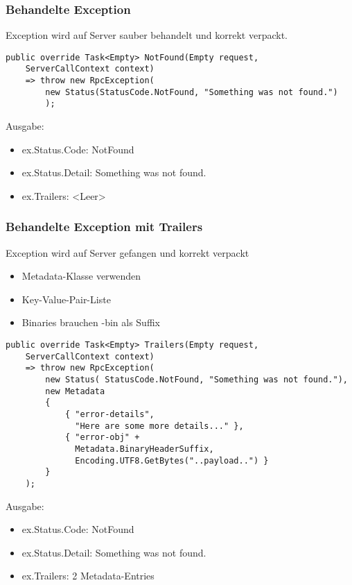 \begin{multicols*}{2}
\subsubsection{Behandelte Exception}
Exception wird auf Server sauber behandelt und korrekt verpackt.
\begin{lstlisting}
public override Task<Empty> NotFound(Empty request,
    ServerCallContext context)
    => throw new RpcException(
        new Status(StatusCode.NotFound, "Something was not found.") 
        );
\end{lstlisting}
Ausgabe:
\begin{itemize}
    \item ex.Status.Code: NotFound
    \item ex.Status.Detail: Something was not found.
    \item ex.Trailers: <Leer>
\end{itemize}
\subsubsection{Behandelte Exception mit Trailers}
Exception wird auf Server gefangen und korrekt verpackt
\begin{itemize}
    \item Metadata-Klasse verwenden
    \item Key-Value-Pair-Liste
    \item Binaries brauchen -bin als Suffix
\end{itemize}
\begin{lstlisting}
public override Task<Empty> Trailers(Empty request,
    ServerCallContext context)
    => throw new RpcException(
        new Status( StatusCode.NotFound, "Something was not found."),
        new Metadata
        {
            { "error-details",
              "Here are some more details..." },
            { "error-obj" +
              Metadata.BinaryHeaderSuffix,
              Encoding.UTF8.GetBytes("..payload..") }
        }
    );
\end{lstlisting}
Ausgabe:
\begin{itemize}
    \item ex.Status.Code: NotFound
    \item ex.Status.Detail: Something was not found.
    \item ex.Trailers: 2 Metadata-Entries
\end{itemize}

\end{multicols*}
